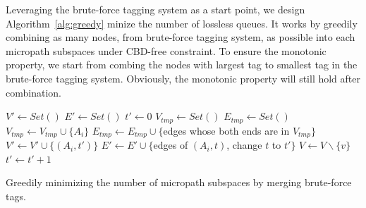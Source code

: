



 Leveraging the brute-force tagging system as a start point, we design Algorithm~\ref{alg:greedy} minize the 
number of lossless queues. It works by greedily combining as many nodes, from brute-force tagging system, 
as possible into each micropath subspaces under CBD-free constraint. To ensure the monotonic property, we start 
from combing the nodes with largest tag to smallest tag in the brute-force tagging system.
Obviously, the monotonic property will still hold after combination. 


\begin{algorithm}
	\small
	$V' \gets Set()$\;
	$E' \gets Set()$\;
	$t' \gets 0$\;
	 {
		$V_{tmp} \gets Set()$\;
		$E_{tmp} \gets Set()$\;
		 {
			$V_{tmp} \gets V_{tmp} \cup \{A_i\}$\;
			$E_{tmp} \gets E_{tmp} \cup \{$edges whose both ends are in $V_{tmp}\}$\;
			 {
				$V' \gets V' \cup \{(A_i, t')\}$\;
				$E' \gets E' \cup \{$edges of $(A_i, t)$, change $t$ to $t'\}$\; 
			}
			$V \gets V \backslash \{v\}$ \;
		}
		 {
			$t' \gets t'+1$\;
		}
	}
	\;
    \caption{Greedily minimizing the number of micropath subspaces by merging brute-force tags.}
	\label{alg:greedy}
\end{algorithm}

